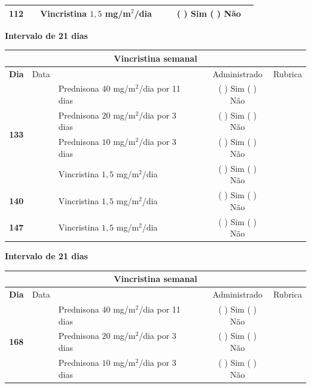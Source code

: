 \documentclass[11pt,a4paper,oldfontcommands]{memoir}
\begin{document}
\begin{center}
\begin{longtable}{p{1cm}c|p{5cm}|p{1cm}p{2cm}|c|c}
    \cline{1-3}\cline{6-6}
    \multicolumn{1}{c|}{\textbf{112}}&&{Vincristina \(1,5\) mg/m\(^2\)/dia}&\multicolumn{1}{c}{}&&{(  ) Sim (  ) Não}&\\
    \hline
\end{longtable}
\textbf{Intervalo de 21 dias}
\begin{longtable}{p{1cm}c|p{5cm}|p{1cm}p{2cm}|c|c}
	\hline
	\multicolumn{7}{c}{Vincristina semanal} \\
	\hline
	\multicolumn{1}{c|}{\multirow{1}{*}{\textbf{Dia}}}&{Data}&{}&{}&&{Administrado}&{Rubrica} \\
    \hline
    \multicolumn{1}{c|}{\multirow{4}{*}{\textbf{133}}}&&{Prednisona \(40\) mg/m\(^2\)/dia por 11 dias}&\multicolumn{1}{c}{}&&{(  ) Sim (  ) Não}&\\
    \multicolumn{1}{c|}{}&&{Prednisona \(20\) mg/m\(^2\)/dia por 3 dias}&\multicolumn{1}{c}{}&&{(  ) Sim (  ) Não}&\\
    \multicolumn{1}{c|}{}&&{Prednisona \(10\) mg/m\(^2\)/dia por 3 dias}&\multicolumn{1}{c}{}&&{(  ) Sim (  ) Não}&\\
    \multicolumn{1}{c|}{\textbf{}}&&{Vincristina \(1,5\) mg/m\(^2\)/dia}&\multicolumn{1}{c}{}&&{(  ) Sim (  ) Não}&\\
    \cline{1-6}
    \multicolumn{1}{c|}{\textbf{140}}&&{Vincristina \(1,5\) mg/m\(^2\)/dia}&\multicolumn{1}{c}{}&&{(  ) Sim (  ) Não}&\\
    \cline{1-3}\cline{6-6}
    \multicolumn{1}{c|}{\textbf{147}}&&{Vincristina \(1,5\) mg/m\(^2\)/dia}&\multicolumn{1}{c}{}&&{(  ) Sim (  ) Não}&\\
    \hline
\end{longtable}
\textbf{Intervalo de 21 dias}
\\[0.8cm]
\begin{longtable}{p{1cm}c|p{5cm}|p{1cm}p{2cm}|c|c}
	\hline
	\multicolumn{7}{c}{Vincristina semanal} \\
	\hline
	\multicolumn{1}{c|}{\multirow{1}{*}{\textbf{Dia}}}&{Data}&{}&{}&&{Administrado}&{Rubrica} \\
    \hline
    \multicolumn{1}{c|}{\multirow{4}{*}{\textbf{168}}}&&{Prednisona \(40\) mg/m\(^2\)/dia por 11 dias}&\multicolumn{1}{c}{}&&{(  ) Sim (  ) Não}&\\
    \multicolumn{1}{c|}{}&&{Prednisona \(20\) mg/m\(^2\)/dia por 3 dias}&\multicolumn{1}{c}{}&&{(  ) Sim (  ) Não}&\\
    \multicolumn{1}{c|}{}&&{Prednisona \(10\) mg/m\(^2\)/dia por 3 dias}&\multicolumn{1}{c}{}&&{(  ) Sim (  ) Não}&\\

\end{longtable}
\end{center}
\end{document}
